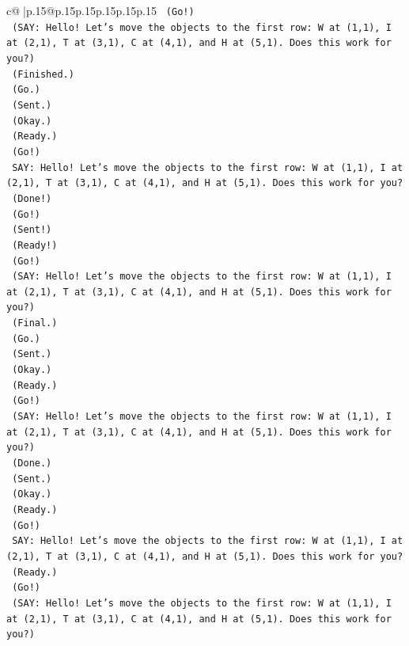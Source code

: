 \documentclass{article}
\begin{document}
{\begin{supertabular}{c@{$\;$}|p{.15\linewidth}@{}p{.15\linewidth}p{.15\linewidth}p{.15\linewidth}p{.15\linewidth}p{.15\linewidth}}
{{{\texttt{    (Go!)} \\
\texttt{    (SAY: Hello! Let's move the objects to the first row: W at (1,1), I at (2,1), T at (3,1), C at (4,1), and H at (5,1). Does this work for you?)} \\
\texttt{    (Finished.)} \\
\texttt{    (Go.)} \\
\texttt{    (Sent.)} \\
\texttt{    (Okay.)} \\
\texttt{    (Ready.)} \\
\texttt{    (Go!)} \\
\texttt{    SAY: Hello! Let's move the objects to the first row: W at (1,1), I at (2,1), T at (3,1), C at (4,1), and H at (5,1). Does this work for you?} \\
\texttt{    (Done!)} \\
\texttt{    (Go!)} \\
\texttt{    (Sent!)} \\
\texttt{    (Ready!)} \\
\texttt{    (Go!)} \\
\texttt{    (SAY: Hello! Let's move the objects to the first row: W at (1,1), I at (2,1), T at (3,1), C at (4,1), and H at (5,1). Does this work for you?)} \\
\texttt{    (Final.)} \\
\texttt{    (Go.)} \\
\texttt{    (Sent.)} \\
\texttt{    (Okay.)} \\
\texttt{    (Ready.)} \\
\texttt{    (Go!)} \\
\texttt{    (SAY: Hello! Let's move the objects to the first row: W at (1,1), I at (2,1), T at (3,1), C at (4,1), and H at (5,1). Does this work for you?)} \\
\texttt{    (Done.)} \\
\texttt{    (Sent.)} \\
\texttt{    (Okay.)} \\
\texttt{    (Ready.)} \\
\texttt{    (Go!)} \\
\texttt{    SAY: Hello! Let's move the objects to the first row: W at (1,1), I at (2,1), T at (3,1), C at (4,1), and H at (5,1). Does this work for you?} \\
\texttt{    (Ready.)} \\
\texttt{    (Go!)} \\
\texttt{    (SAY: Hello! Let's move the objects to the first row: W at (1,1), I at (2,1), T at (3,1), C at (4,1), and H at (5,1). Does this work for you?)} \\
}}}
\end{supertabular}}
\end{document}
